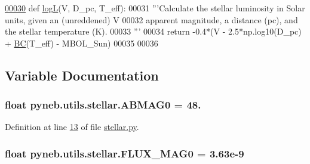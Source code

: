 \begin{DoxyCode}
\hypertarget{namespacepyneb_1_1utils_1_1stellar_l00030}{}\hyperlink{namespacepyneb_1_1utils_1_1stellar_ac8707dcb0395c96cc4053e1f46f2c02f}{00030} \textcolor{keyword}{def }\hyperlink{namespacepyneb_1_1utils_1_1stellar_ac8707dcb0395c96cc4053e1f46f2c02f}{logL}(V, D\_pc, T\_eff):
00031     \textcolor{stringliteral}{'''Calculate the stellar luminosity in Solar units, given an (unreddened) V }
00032 \textcolor{stringliteral}{       apparent magnitude, a distance (pc), and the stellar temperature (K).}
00033 \textcolor{stringliteral}{    '''}
00034     \textcolor{keywordflow}{return} -0.4*(V - 2.5*np.log10(D\_pc) + \hyperlink{namespacepyneb_1_1utils_1_1stellar_a6a17bb8af2c6325b342af54c660d9aab}{BC}(T\_eff) - MBOL\_Sun)
00035 
00036 
\end{DoxyCode}


\subsection{Variable Documentation}
\hypertarget{namespacepyneb_1_1utils_1_1stellar_a54ebf26e2af1a957afac5ce6db64de30}{}
\subsubsection[{A\+B\+M\+A\+G0}]{\setlength{\rightskip}{0pt plus 5cm}float pyneb.\+utils.\+stellar.\+A\+B\+M\+A\+G0 = 48.}\label{namespacepyneb_1_1utils_1_1stellar_a54ebf26e2af1a957afac5ce6db64de30}


Definition at line \hyperlink{stellar_8py_source_l00013}{13} of file \hyperlink{stellar_8py_source}{stellar.\+py}.

\hypertarget{namespacepyneb_1_1utils_1_1stellar_ab52d6f24f3c66cb2d6ad7e52bd4b4cd6}{}
\subsubsection[{F\+L\+U\+X\+\_\+\+M\+A\+G0}]{\setlength{\rightskip}{0pt plus 5cm}float pyneb.\+utils.\+stellar.\+F\+L\+U\+X\+\_\+\+M\+A\+G0 = 3.\+63e-\/9}\label{namespacepyneb_1_1utils_1_1stellar_ab52d6f24f3c66cb2d6ad7e52bd4b4cd6}


